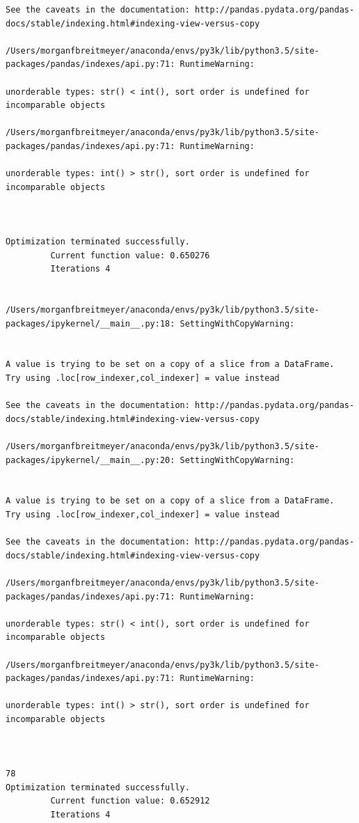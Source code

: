 \begin{lstlisting}
See the caveats in the documentation: http://pandas.pydata.org/pandas-docs/stable/indexing.html#indexing-view-versus-copy

/Users/morganfbreitmeyer/anaconda/envs/py3k/lib/python3.5/site-packages/pandas/indexes/api.py:71: RuntimeWarning:

unorderable types: str() < int(), sort order is undefined for incomparable objects

/Users/morganfbreitmeyer/anaconda/envs/py3k/lib/python3.5/site-packages/pandas/indexes/api.py:71: RuntimeWarning:

unorderable types: int() > str(), sort order is undefined for incomparable objects



Optimization terminated successfully.
         Current function value: 0.650276
         Iterations 4


/Users/morganfbreitmeyer/anaconda/envs/py3k/lib/python3.5/site-packages/ipykernel/__main__.py:18: SettingWithCopyWarning:


A value is trying to be set on a copy of a slice from a DataFrame.
Try using .loc[row_indexer,col_indexer] = value instead

See the caveats in the documentation: http://pandas.pydata.org/pandas-docs/stable/indexing.html#indexing-view-versus-copy

/Users/morganfbreitmeyer/anaconda/envs/py3k/lib/python3.5/site-packages/ipykernel/__main__.py:20: SettingWithCopyWarning:


A value is trying to be set on a copy of a slice from a DataFrame.
Try using .loc[row_indexer,col_indexer] = value instead

See the caveats in the documentation: http://pandas.pydata.org/pandas-docs/stable/indexing.html#indexing-view-versus-copy

/Users/morganfbreitmeyer/anaconda/envs/py3k/lib/python3.5/site-packages/pandas/indexes/api.py:71: RuntimeWarning:

unorderable types: str() < int(), sort order is undefined for incomparable objects

/Users/morganfbreitmeyer/anaconda/envs/py3k/lib/python3.5/site-packages/pandas/indexes/api.py:71: RuntimeWarning:

unorderable types: int() > str(), sort order is undefined for incomparable objects



78
Optimization terminated successfully.
         Current function value: 0.652912
         Iterations 4



\end{lstlisting}

